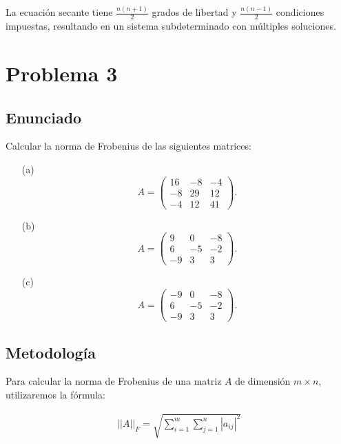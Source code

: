 \documentclass{article}
\begin{document}
La ecuación secante tiene $\frac{n(n+1)}{2}$ grados de libertad y $\frac{n(n-1)}{2}$ condiciones impuestas, resultando en un sistema subdeterminado con múltiples soluciones.

\section{Problema 3}

\subsection{Enunciado}

Calcular la norma de Frobenius de las siguientes matrices:

\begin{itemize}
    \item[(a)] \[A=\begin{pmatrix}
                        16 & -8 & -4\\
                        -8 & 29 & 12\\
                        -4 & 12 & 41
                    \end{pmatrix}.\]
    \item[(b)] \[A=\begin{pmatrix}
                        9 & 0 & -8\\
                        6 & -5 & -2\\
                        -9 & 3 & 3
                    \end{pmatrix}.\]
    \item[(c)] \[A=\begin{pmatrix}
                        -9 & 0 & -8\\
                        6 & -5 & -2\\
                        -9 & 3 & 3
                    \end{pmatrix}.\]
\end{itemize}

\subsection{Metodología}

Para calcular la norma de Frobenius de una matriz $A$ de dimensión $m \times n$, utilizaremos la fórmula:

\begin{align}
    ||A||_F = \sqrt{\sum_{i=1}^{m} \sum_{j=1}^{n} |a_{ij}|^2}
\end{align}
\end{document}

